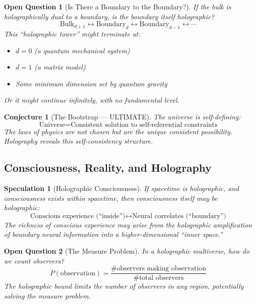 \documentclass[12pt,a4paper]{article}
\newtheorem{conjecture}[theorem]{Conjecture}
\newtheorem*{openquestion}{Open Question}
\newtheorem*{speculation}{Speculation}
\begin{document}
\begin{openquestion}[Is There a Boundary to the Boundary?]
If the bulk is holographically dual to a boundary, is the boundary itself holographic?
\begin{equation}
\text{Bulk}_{d+1} \leftrightarrow \text{Boundary}_d \leftrightarrow \text{Boundary}_{d-1} \leftrightarrow \cdots
\end{equation}
This ``holographic tower'' might terminate at:
\begin{itemize}
    \item $d = 0$ (a quantum mechanical system)
    \item $d = 1$ (a matrix model)
    \item Some minimum dimension set by quantum gravity
\end{itemize}
Or it might continue infinitely, with no fundamental level.
\end{openquestion}

\begin{conjecture}[The Bootstrap --- ULTIMATE]
The universe is self-defining:
\begin{equation}
\text{Universe} = \text{Consistent solution to self-referential constraints}
\end{equation}
The laws of physics are not chosen but are the unique consistent possibility. Holography reveals this self-consistency structure.
\end{conjecture}

\subsection{Consciousness, Reality, and Holography}

\begin{speculation}[Holographic Consciousness]
If spacetime is holographic, and consciousness exists within spacetime, then consciousness itself may be holographic:
\begin{equation}
\text{Conscious experience (``inside'')} \longleftrightarrow \text{Neural correlates (``boundary'')}
\end{equation}
The richness of conscious experience may arise from the holographic amplification of boundary neural information into a higher-dimensional ``inner space.''
\end{speculation}

\begin{openquestion}[The Measure Problem]
In a holographic multiverse, how do we count observers?
\begin{equation}
P(\text{observation}) = \frac{\# \text{observers making observation}}{\# \text{total observers}}
\end{equation}
The holographic bound limits the number of observers in any region, potentially solving the measure problem.
\end{openquestion}
\end{document}

